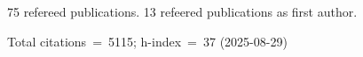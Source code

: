 75 refereed publications. 13 refeered publications as first author.

Total citations~=~5115; h-index~=~37 (2025-08-29)